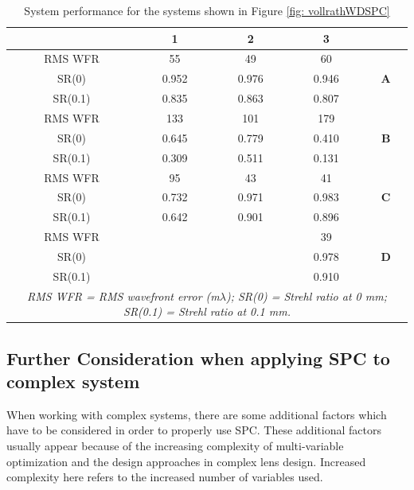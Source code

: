 \setlength{\arrayrulewidth}{.5mm}
\setlength{\tabcolsep}{18pt}
\renewcommand{\arraystretch}{1.2}
\begin{table}[h!]
    \centering
    \captionsetup{justification=centering}
    \caption{System performance for the systems shown in Figure \ref{fig: vollrathWDSPC}}
    \label{table: vollrathWDcase}
    \vspace{-1em}
    \begin{adjustbox}{max width=\textwidth, center}
    \begin{tabular}{c c c c c}
    \hline 
       & \textbf{1} & \textbf{2} & \textbf{3} & \\ 
     \midrule
    RMS WFR & 55 & 49 & 60 & \multirow{3}{*}{\textbf{A}} \\ 
    SR(0) & 0.952 & 0.976 & 0.946  \\
    SR(0.1) & 0.835 & 0.863 & 0.807  \\
    \midrule
    RMS WFR & 133 & 101 & 179 & \multirow{3}{*}{\textbf{B}} \\ 
    SR(0) & 0.645 & 0.779 & 0.410  \\
    SR(0.1) & 0.309 & 0.511 & 0.131  \\
    \midrule
    RMS WFR & 95 & 43 & 41 & \multirow{3}{*}{\textbf{C}} \\ 
    SR(0) & 0.732 & 0.971 & 0.983  \\
    SR(0.1) & 0.642 & 0.901 & 0.896 \\
    \midrule
    RMS WFR &  & & 39 & \multirow{3}{*}{\textbf{D}} \\ 
    SR(0) &  &  & 0.978 \\
    SR(0.1) &  &  & 0.910 \\
    \hline
    \multicolumn{5}{c}{\textit{\footnotesize{RMS WFR = RMS wavefront error (m$\lambda$); SR(0) = Strehl ratio at 0 mm; SR(0.1) = Strehl ratio at 0.1 mm.}}}\\
    \end{tabular}
    \end{adjustbox}
\end{table}

\pagebreak
\pagebreak %
\subsection{Further Consideration when applying SPC to complex system}

When working with complex systems, there are some additional factors which have to be considered in order to properly use SPC. These additional factors usually appear because of the increasing complexity of multi-variable optimization and the design approaches in complex lens design. Increased complexity here refers to the increased number of variables used. 

